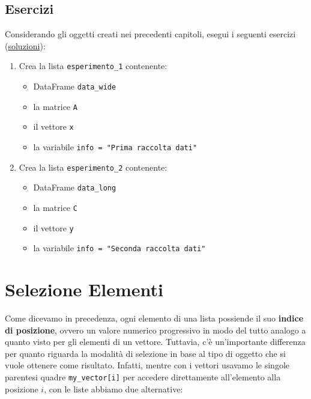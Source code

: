 \documentclass[
]{book}
\providecommand{\tightlist}{%
  \setlength{\itemsep}{0pt}\setlength{\parskip}{0pt}}
\begin{document}
\hypertarget{esercizi-12}{%
\subsection*{Esercizi}\label{esercizi-12}}

Considerando gli oggetti creati nei precedenti capitoli, esegui i seguenti esercizi (\href{https://github.com/psicostat/Introduction2R/blob/master/exercises/chapter-11-lists.R}{soluzioni}):

\begin{enumerate}
\def\labelenumi{\arabic{enumi}.}
\tightlist
\item
  Crea la lista \texttt{esperimento\_1} contenente:

  \begin{itemize}
  \tightlist
  \item
    DataFrame \texttt{data\_wide}
  \item
    la matrice \texttt{A}
  \item
    il vettore \texttt{x}
  \item
    la variabile \texttt{info\ =\ "Prima\ raccolta\ dati"}
  \end{itemize}
\item
  Crea la lista \texttt{esperimento\_2} contenente:

  \begin{itemize}
  \tightlist
  \item
    DataFrame \texttt{data\_long}
  \item
    la matrice \texttt{C}
  \item
    il vettore \texttt{y}
  \item
    la variabile \texttt{info\ =\ "Seconda\ raccolta\ dati"}
  \end{itemize}
\end{enumerate}

\hypertarget{selezione-elementi}{%
\section{Selezione Elementi}\label{selezione-elementi}}

Come dicevamo in precedenza, ogni elemento di una lista possiende il suo \textbf{indice di posizione}, ovvero un valore numerico progressivo in modo del tutto analogo a quanto visto per gli elementi di un vettore. Tuttavia, c'è un'importante differenza per quanto riguarda la modalità di selezione in base al tipo di oggetto che si vuole ottenere come risultato. Infatti, mentre con i vettori usavamo le singole parentesi quadre \texttt{my\_vector{[}i{]}} per accedere direttamente all'elemento alla posizione \(i\), con le liste abbiamo due alternative:
\end{document}
